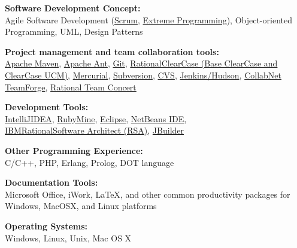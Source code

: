 \blankline

{\textbf{Software Development Concept:}}\\
Agile Software Development 
(\href{http://en.wikipedia.org/wiki/Scrum_\%28development\%29}{Scrum}, 
\href{http://www.extremeprogramming.org/}{Extreme Programming}), Object-oriented Programming, UML, Design \nolinebreak Patterns

\blankline

{\textbf{Project management and team collaboration tools:}}\\
\href{http://maven.apache.org/}{Apache Maven},
\href{http://ant.apache.org/}{Apache Ant}, 
\href{http://git-scm.com/}{Git}, \href{http://www-01.ibm.com/software/awdtools/clearcase/index.html}{Rational\textregistered\space ClearCase (Base ClearCase and ClearCase UCM)},
\href{http://mercurial.selenic.com/}{Mercurial},
\href{http://subversion.tigris.org/}{Subversion}, 
\href{http://www.nongnu.org/cvs/}{CVS},
\href{http://jenkins-ci.org/}{Jenkins/Hudson},
\href{http://www.open.collab.net/products/ctf/}{CollabNet TeamForge},
\href{https://jazz.net/projects/rational-team-concert/}{Rational Team Concert}

\blankline

{\textbf{Development Tools:}}\\
\href{http://www.jetbrains.com/idea/}{IntelliJ\textregistered\space IDEA},
\href{http://www.jetbrains.com/ruby}{RubyMine\texttrademark},
\href{http://www.eclipse.org/}{Eclipse},
\href{http://netbeans.org/}{NetBeans IDE}, \\
\href{http://www.ibm.com/developerworks/rational/products/rsa/}{IBM\textregistered\space Rational\textregistered\space Software Architect (RSA)},
\href{http://www.embarcadero.com/products/jbuilder}{JBuilder}

\blankline

{\textbf{Other Programming Experience:}}\\
C/C++, PHP, Erlang, Prolog, DOT language

\blankline

{\textbf{Documentation Tools:}}\\ 
Microsoft Office, iWork, \LaTeX{}, 
and other common productivity packages for Windows, Mac\nolinebreak\space OS\nolinebreak\space X, and
Linux platforms

\blankline

{\textbf{Operating Systems:}}\\
Windows, Linux, Unix, Mac OS X\\
